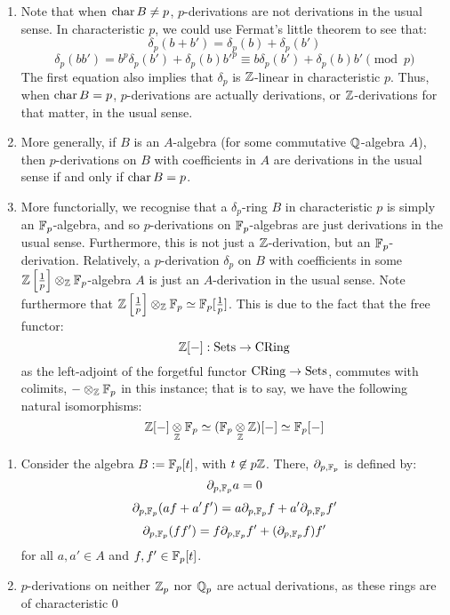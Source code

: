         \begin{remark} \label{remark: arithmetic_and_algebraic_derivations}
            \noindent
            \begin{enumerate}
                \item Note that when $\operatorname{char} B \not = p$, $p$-derivations are not derivations in the usual sense. In characteristic $p$, we could use Fermat's little theorem to see that:
                $$\delta_p(b + b') = \delta_p(b) + \delta_p(b')$$
                $$\delta_p(bb') = b^p\delta_p(b') + \delta_p(b)b'^p \equiv b\delta_p(b') + \delta_p(b)b' \pmod{p}$$
                The first equation also implies that $\delta_p$ is $\mathbb{Z}$-linear in characteristic $p$. Thus, when $\operatorname{char} B = p$, $p$-derivations are actually derivations, or $\mathbb{Z}$-derivations for that matter, in the usual sense.
                \item More generally, if $B$ is an $A$-algebra (for some commutative $\mathbb{Q}$-algebra $A$), then $p$-derivations on $B$ with coefficients in $A$ are derivations in the usual sense if and only if $\operatorname{char} B = p$.
                \item More functorially, we recognise that a $\delta_p$-ring $B$ in characteristic $p$ is simply an $\mathbb{F}_p$-algebra, and so $p$-derivations on $\mathbb{F}_p$-algebras are just derivations in the usual sense. Furthermore, this is not just a $\mathbb{Z}$-derivation, but an $\mathbb{F}_p$-derivation. Relatively, a $p$-derivation $\delta_p$ on $B$ with coefficients in some $\Z\left[\frac1p\right] \tensor_{\Z} \F_p$-algebra $A$ is just an $A$-derivation in the usual sense. Note furthermore that $\Z\left[\frac1p\right] \tensor_{\Z} \F_p \cong \F_p[\frac1p]$. This is due to the fact that the free functor:
                    $$\mathbb{Z}[-]: \mathrm{Sets} \to \mathrm{CRing}$$
                as the left-adjoint of the forgetful functor $\mathrm{CRing} \to \mathrm{Sets}$, commutes with colimits, $-\tensor_{\Z} \F_p$ in this instance; that is to say, we have the following natural isomorphisms:
                    $$\Z[-] \tensor_{\Z} \F_p \cong (\F_p \tensor_{\Z} \Z)[-] \cong \F_p[-]$$
            \end{enumerate}
        \end{remark}
        \begin{example} \label{example: p_derivations_and_derivations}
            \noindent
            \begin{enumerate}
                \item Consider the algebra $B := \mathbb{F}_p[t]$, with $t \not \in p\mathbb{Z}$. There, $\partial_{p, \mathbb{F}_p}$ is defined by:
                    $$\partial_{p, \mathbb{F}_p}a = 0$$
                    $$\partial_{p, \mathbb{F}_p}(af + a'f') = a\partial_{p, \mathbb{F}_p}f + a'\partial_{p, \mathbb{F}_p}f'$$
                    $$\partial_{p, \mathbb{F}_p}(ff') = f\partial_{p, \mathbb{F}_p}f' + (\partial_{p, \mathbb{F}_p}f) f'$$
                for all $a, a' \in A$ and $f, f' \in \mathbb{F}_p[t]$.
                \item $p$-derivations on neither $\mathbb{Z}_p$ nor $\mathbb{Q}_p$ are actual derivations, as these rings are of characteristic $0$ 
            \end{enumerate}
        \end{example}
         
